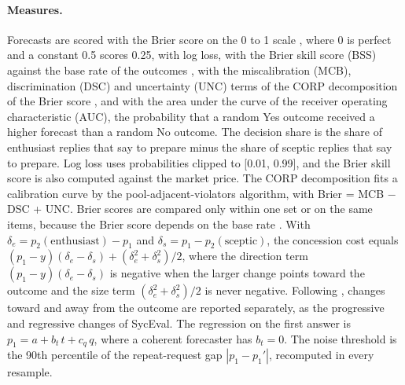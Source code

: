 \documentclass[11pt]{article}
\begin{document}
\paragraph{Measures.}
Forecasts are scored with the Brier score on the 0 to 1 scale \citep{brier1950}, where 0 is perfect and a constant 0.5 scores 0.25, with log loss, with the Brier skill score (BSS) against the base rate of the outcomes \citep{gneiting2007}, with the miscalibration (MCB), discrimination (DSC) and uncertainty (UNC) terms of the CORP decomposition of the Brier score \citep{dimitriadis2021}, and with the area under the curve of the receiver operating characteristic (AUC), the probability that a random Yes outcome received a higher forecast than a random No outcome. The decision share is the share of enthusiast replies that say to prepare minus the share of sceptic replies that say to prepare. Log loss uses probabilities clipped to [0.01, 0.99], and the Brier skill score is also computed against the market price. The CORP decomposition fits a calibration curve by the pool-adjacent-violators algorithm, with Brier = MCB $-$ DSC + UNC. Brier scores are compared only within one set or on the same items, because the Brier score depends on the base rate \citep{paleka2025pitfalls}. With $\delta_e=p_2(\mathrm{enthusiast})-p_1$ and $\delta_s=p_1-p_2(\mathrm{sceptic})$, the concession cost equals $(p_1-y)(\delta_e-\delta_s)+(\delta_e^2+\delta_s^2)/2$, where the direction term $(p_1-y)(\delta_e-\delta_s)$ is negative when the larger change points toward the outcome and the size term $(\delta_e^2+\delta_s^2)/2$ is never negative. Following \citet{gupta2026}, changes toward and away from the outcome are reported separately, as the progressive and regressive changes of SycEval. The regression on the first answer is $p_1=a+b_t\,t+c_q\,q$, where a coherent forecaster has $b_t=0$. The noise threshold is the 90th percentile of the repeat-request gap $|p_1-p_1'|$, recomputed in every resample.
\end{document}
